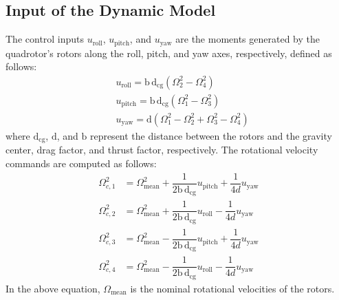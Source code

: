 \documentclass[preprint,12pt,authoryear]{elsarticle}
\begin{document}
\subsection{Input of the Dynamic Model}
\noindent The control inputs $u_{\text{roll}}$, $u_{\text{pitch}}$, and $u_{\text{yaw}}$ are the moments generated by the quadrotor's rotors along the roll, pitch, and yaw axes, respectively, defined as follows: %
\begin{align}
		&u_{\text{roll}} = \mathrm{b\,d}_{\text{cg}} (\Omega_2^2 - \Omega_4^2)\\
	&u_{\text{pitch}} = \mathrm{b\,d}_{\text{cg}} (\Omega_1^2 - \Omega_3^2) \\
	&u_{\text{yaw}} = \mathrm{d} (\Omega_1^2 - \Omega_2^2 + \Omega_3^2 - \Omega_4^2)
\end{align}
where $\mathrm{d}_{\text{cg}}$, $\text{d}$, and $\text{b}$ represent the distance between the rotors and the gravity center, drag factor, and thrust factor, respectively. The rotational velocity commands are computed as follows:
\begin{align}
    \Omega_{c, 1}^2 &= \Omega_{\text{mean}}^2 + \dfrac{1}{2\mathrm{b\,d}_{\text{cg}}}u_{\text{pitch}} + \dfrac{1}{4d}u_{\text{yaw}} \\
    \Omega_{c, 2}^2 &= \Omega_{\text{mean}}^2 + \dfrac{1}{2\mathrm{b\,d}_{\text{cg}}}u_{\text{roll}} - \dfrac{1}{4d}u_{\text{yaw}}\\
    \Omega_{c, 3}^2 &= \Omega_{\text{mean}}^2 - \dfrac{1}{2\mathrm{b\,d}_{\text{cg}}}u_{\text{pitch}} + \dfrac{1}{4d}u_{\text{yaw}} \\
    \Omega_{c, 4}^2 &= \Omega_{\text{mean}}^2 - \dfrac{1}{2\mathrm{b\,d}_{\text{cg}}}u_{\text{roll}} - \dfrac{1}{4d}u_{\text{yaw}}
\end{align}
In the above equation, $\Omega_{\text{mean}}$ is the  nominal rotational velocities of the rotors.
\end{document}
